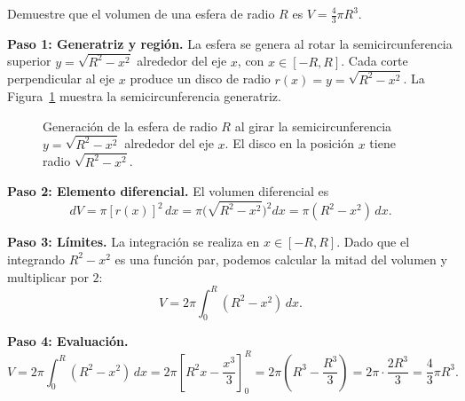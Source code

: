 \begin{example}
Demuestre que el volumen de una esfera de radio $R$ es
$V = \frac{4}{3}\pi R^3$.

\begin{myproof}
\textbf{Paso 1: Generatriz y región.}
La esfera se genera al rotar la semicircunferencia superior $y=\sqrt{R^2-x^2}$ alrededor del eje $x$,
con $x\in[-R,R]$. Cada corte perpendicular al eje $x$ produce un disco de radio $r(x)=y=\sqrt{R^2-x^2}$.
La Figura~\ref{fig:esfera_discos} muestra la semicircunferencia generatriz.

\begin{figure}[H]
\centering
\caption{Generación de la esfera de radio $R$ al girar la semicircunferencia $y=\sqrt{R^2-x^2}$ alrededor del eje $x$. El disco en la posición $x$ tiene radio $\sqrt{R^2-x^2}$.}
\label{fig:esfera_discos}
\end{figure}

\textbf{Paso 2: Elemento diferencial.}
El volumen diferencial es
\[ dV = \pi [r(x)]^2\,dx = \pi\bigl(\sqrt{R^2-x^2}\bigr)^2 dx = \pi(R^2-x^2)\,dx. \]

\textbf{Paso 3: Límites.}
La integración se realiza en $x\in[-R,R]$. Dado que el integrando $R^2-x^2$ es una función par,
podemos calcular la mitad del volumen y multiplicar por $2$:
\[ V = 2\pi\int_0^R (R^2-x^2)\,dx. \]

\textbf{Paso 4: Evaluación.}
\[
  V = 2\pi\int_0^R (R^2-x^2)\,dx
    = 2\pi\left[R^2 x - \frac{x^3}{3}\right]_0^R
    = 2\pi\left(R^3 - \frac{R^3}{3}\right)
    = 2\pi\cdot\frac{2R^3}{3}
    = \boxed{\dfrac{4}{3}\pi R^3}.
\]
\end{myproof}
\end{example}

